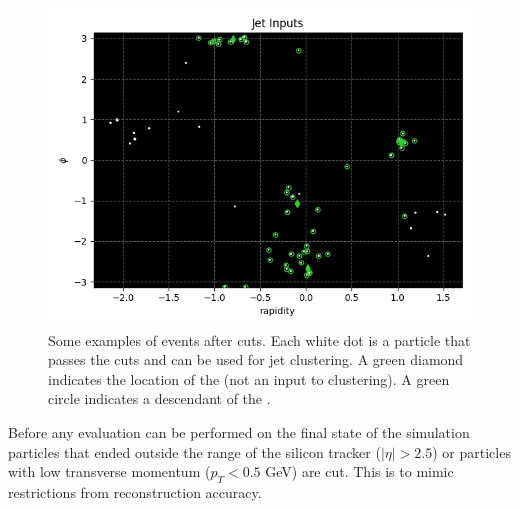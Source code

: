 \begin{figure}[htp]
\begin{minipage}[c]{0.48\textwidth}
        \includegraphics[width=1\textwidth]{graphics/truth_1378.png}
    \end{minipage}\hfill
    \caption{Some examples of events after cuts. Each white dot is a particle that
             passes the cuts and can be used for jet clustering.
             A green diamond indicates the location of the 
             (not an input to clustering).
         A green circle indicates a descendant of the .}
\end{figure}    


Before any evaluation can be performed on the final state of the simulation
particles that ended outside the range of the silicon tracker (\(|\eta|>2.5\))
or particles with low transverse momentum (\(p_T < 0.5\) GeV) are cut.
This is to mimic restrictions from reconstruction accuracy.

